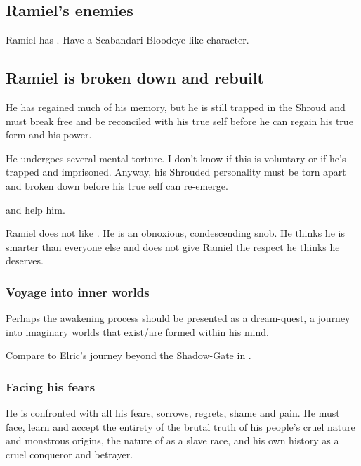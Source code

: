 \begin{garbage}
\subsection{Ramiel's enemies}
Ramiel has . 
Have a Scabandari Bloodeye-like character. 







\subsection{Ramiel is broken down and rebuilt}
He has regained much of his memory, but he is still trapped in the Shroud and must break free and be reconciled with his true self before he can regain his true \resphan{} form and his \sathariah{} power. 

He undergoes several mental torture. I don't know if this is voluntary or if he's trapped and imprisoned. Anyway, his Shrouded personality must be torn apart and broken down before his true self can re-emerge. 

\Cishiel{} and \Gilchad{} help him. 

Ramiel does not like \Gilchad. 
He is an obnoxious, condescending snob. 
He thinks he is smarter than everyone else and does not give Ramiel the respect he thinks he deserves. 





\subsubsection{Voyage into inner worlds}
Perhaps the awakening process should be presented as a dream-quest, a journey into imaginary worlds that exist/are formed within his mind. 

Compare to Elric's journey beyond the Shadow-Gate in \cite{MichaelMoorcock:ElricofMelnibone}. 





\subsubsection{Facing his fears}
He is confronted with all his fears, sorrows, regrets, shame and pain. He must face, learn and accept the entirety of the brutal truth of his people's cruel nature and monstrous origins, the nature of \humans{} as a slave race, and his own history as a cruel conqueror and betrayer. 


\end{garbage}
